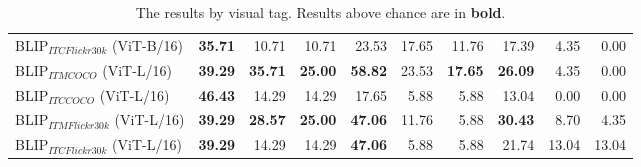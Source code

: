 \begin{table*}
\begin{adjustbox}{max width=\textwidth}
\begin{tabular}{l|rrr|rrr|rrr}
 BLIP$_{ITC Flickr30k}$ (ViT-B/16)   & \textbf{35.71} & 10.71          & 10.71          & 23.53          & 17.65          & 11.76          & 17.39          & 4.35           & 0.00           \\
 BLIP$_{ITM COCO}$ (ViT-L/16)        & \textbf{39.29} & \textbf{35.71} & \textbf{25.00} & \textbf{58.82} & 23.53          & \textbf{17.65} & \textbf{26.09} & 4.35           & 0.00           \\
 BLIP$_{ITC COCO}$ (ViT-L/16)        & \textbf{46.43} & 14.29          & 14.29          & 17.65          & 5.88           & 5.88           & 13.04          & 0.00           & 0.00           \\
 BLIP$_{ITM Flickr30k}$ (ViT-L/16)   & \textbf{39.29} & \textbf{28.57} & \textbf{25.00} & \textbf{47.06} & 11.76          & 5.88           & \textbf{30.43} & 8.70           & 4.35           \\
 BLIP$_{ITC Flickr30k}$ (ViT-L/16)   & \textbf{39.29} & 14.29          & 14.29          & \textbf{47.06} & 5.88           & 5.88           & 21.74          & 13.04          & 13.04          \\
\bottomrule
\end{tabular}
  \end{adjustbox}
  \caption{The results by visual tag. Results above chance are in \textbf{bold}.}
    \label{tab:results-by-visual-tag-ours}
\end{table*}
